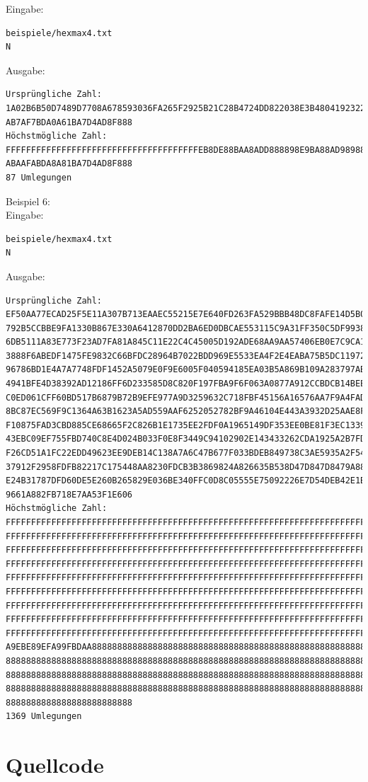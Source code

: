 \documentclass[a4paper,10pt,ngerman]{scrartcl}
\begin{document}
Eingabe: \begin{lstlisting}
beispiele/hexmax4.txt
N
\end{lstlisting}
Ausgabe: \begin{lstlisting}
Ursprüngliche Zahl:
1A02B6B50D7489D7708A678593036FA265F2925B21C28B4724DD822038E3B4804192322F230
AB7AF7BDA0A61BA7D4AD8F888
Höchstmögliche Zahl:
FFFFFFFFFFFFFFFFFFFFFFFFFFFFFFFFFFFFFFEB8DE88BAA8ADD888898E9BA88AD98988F898
ABAAFABDA8A81BA7D4AD8F888
87 Umlegungen
\end{lstlisting}
Beispiel 6: \\
Eingabe: \begin{lstlisting}
beispiele/hexmax4.txt
N
\end{lstlisting}
Ausgabe: \begin{lstlisting}
Ursprüngliche Zahl:
EF50AA77ECAD25F5E11A307B713EAAEC55215E7E640FD263FA529BBB48DC8FAFE14D5B02EBF
792B5CCBBE9FA1330B867E330A6412870DD2BA6ED0DBCAE553115C9A31FF350C5DF99382488
6DB5111A83E773F23AD7FA81A845C11E22C4C45005D192ADE68AA9AA57406EB0E7C9CA13AD0
3888F6ABEDF1475FE9832C66BFDC28964B7022BDD969E5533EA4F2E4EABA75B5DC119728248
96786BD1E4A7A7748FDF1452A5079E0F9E6005F040594185EA03B5A869B109A283797AB3139
4941BFE4D38392AD12186FF6D233585D8C820F197FBA9F6F063A0877A912CCBDCB14BEECBAE
C0ED061CFF60BD517B6879B72B9EFE977A9D3259632C718FBF45156A16576AA7F9A4FAD40AD
8BC87EC569F9C1364A63B1623A5AD559AAF6252052782BF9A46104E443A3932D25AAE8F8C59
F10875FAD3CBD885CE68665F2C826B1E1735EE2FDF0A1965149DF353EE0BE81F3EC133922EF
43EBC09EF755FBD740C8E4D024B033F0E8F3449C94102902E143433262CDA1925A2B7FD01BE
F26CD51A1FC22EDD49623EE9DEB14C138A7A6C47B677F033BDEB849738C3AE5935A2F54B992
37912F2958FDFB82217C175448AA8230FDCB3B3869824A826635B538D47D847D8479A88F350
E24B31787DFD60DE5E260B265829E036BE340FFC0D8C05555E75092226E7D54DEB42E1BB2CA
9661A882FB718E7AA53F1E606
Höchstmögliche Zahl:
FFFFFFFFFFFFFFFFFFFFFFFFFFFFFFFFFFFFFFFFFFFFFFFFFFFFFFFFFFFFFFFFFFFFFFFFFFF
FFFFFFFFFFFFFFFFFFFFFFFFFFFFFFFFFFFFFFFFFFFFFFFFFFFFFFFFFFFFFFFFFFFFFFFFFFF
FFFFFFFFFFFFFFFFFFFFFFFFFFFFFFFFFFFFFFFFFFFFFFFFFFFFFFFFFFFFFFFFFFFFFFFFFFF
FFFFFFFFFFFFFFFFFFFFFFFFFFFFFFFFFFFFFFFFFFFFFFFFFFFFFFFFFFFFFFFFFFFFFFFFFFF
FFFFFFFFFFFFFFFFFFFFFFFFFFFFFFFFFFFFFFFFFFFFFFFFFFFFFFFFFFFFFFFFFFFFFFFFFFF
FFFFFFFFFFFFFFFFFFFFFFFFFFFFFFFFFFFFFFFFFFFFFFFFFFFFFFFFFFFFFFFFFFFFFFFFFFF
FFFFFFFFFFFFFFFFFFFFFFFFFFFFFFFFFFFFFFFFFFFFFFFFFFFFFFFFFFFFFFFFFFFFFFFFFFF
FFFFFFFFFFFFFFFFFFFFFFFFFFFFFFFFFFFFFFFFFFFFFFFFFFFFFFFFFFFFFFFFFFFFFFFFFFF
FFFFFFFFFFFFFFFFFFFFFFFFFFFFFFFFFFFFFFFFFFFFFFFFFFFFFFFFFFFFFFFFFFFFFFF88EF
A9EBE89EFA99FBDAA8888888888888888888888888888888888888888888888888888888888
888888888888888888888888888888888888888888888888888888888888888888888888888
888888888888888888888888888888888888888888888888888888888888888888888888888
888888888888888888888888888888888888888888888888888888888888888888888888888
8888888888888888888888888
1369 Umlegungen
\end{lstlisting}
\section{Quellcode}

\end{document}
